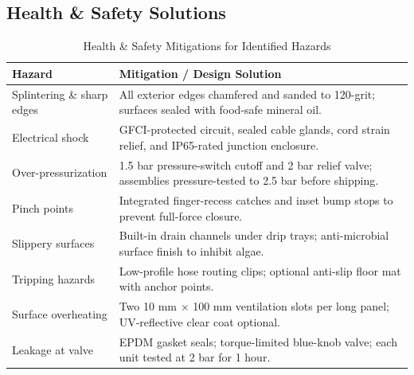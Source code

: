 \documentclass[12pt]{report}
\begin{document}
\subsection{Health \& Safety Solutions}
\begin{table}[h!]
    \centering
    \caption{Health \& Safety Mitigations for Identified Hazards}
    \label{tab:safety_mitigations}
    \begin{tabular}{l p{}}
    \hline
    \textbf{Hazard} & \textbf{Mitigation / Design Solution} \\
    \hline
    Splintering \& sharp edges  & All exterior edges chamfered and sanded to 120-grit; surfaces sealed with food-safe mineral oil. \\

    Electrical shock  & GFCI-protected circuit, sealed cable glands, cord strain relief, and IP65-rated junction enclosure. \\

    Over-pressurization  & 1.5 bar pressure-switch cutoff and 2 bar relief valve; assemblies pressure-tested to 2.5 bar before shipping. \\

    Pinch points  & Integrated finger-recess catches and inset bump stops to prevent full-force closure. \\

    Slippery surfaces  & Built-in drain channels under drip trays; anti-microbial surface finish to inhibit algae. \\

    Tripping hazards  & Low-profile hose routing clips; optional anti-slip floor mat with anchor points. \\

    Surface overheating  & Two 10 mm × 100 mm ventilation slots per long panel; UV-reflective clear coat optional. \\

    Leakage at valve  & EPDM gasket seals; torque-limited blue-knob valve; each unit tested at 2 bar for 1 hour. \\
    \hline
    \end{tabular}
\end{table}
\end{document}
